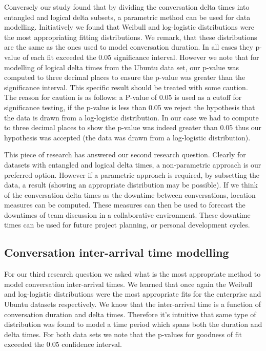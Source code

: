 \documentclass[conference]{IEEEtran}
\begin{document}
Conversely our study found that by dividing the conversation delta times into entangled and logical delta subsets, a parametric method can be used for data modelling. Initiatively we found that Weibull and log-logistic distributions were the most appropriating fitting distributions. We remark, that these distributions are the same as the ones used to model conversation duration. In all cases they p-value of each fit exceeded the 0.05 significance interval. However we note that for modelling of logical delta times from the Ubuntu data set, our p-value was computed to three decimal places to ensure the p-value was greater than the significance interval. This specific result should be treated with some caution. The reason for caution is as follows: a P-value of 0.05 is used as a cutoff for significance testing, if the p-value is less than 0.05 we reject the hypothesis that the data is drawn from a log-logistic distribution. In our case we had to compute to three decimal places to show the p-value was indeed greater than 0.05 thus our hypothesis was accepted (the data was drawn from a log-logistic distribution).  

This piece of research has answered our second research question. Clearly for datasets with entangled and logical delta times, a non-parametric approach is our preferred option. However if a parametric approach is required, by subsetting the data, a result (showing an appropriate distribution may be possible). If we think of the conversation delta times as the downtime between conversations, location measures can be computed. These measures can then be used to forecast the downtimes of team discussion in a collaborative environment. These downtime times can be used for future project planning, or personal development cycles.

\subsection{Conversation inter-arrival time modelling}

For our third research question we asked what is the most appropriate method to model conversation inter-arrival times. We learned that once again the Weibull and log-logistic distributions were the most appropriate fits for the enterprise and Ubuntu datasets respectively. We know that the inter-arrival time is a function of conversation duration and delta times. Therefore it's intuitive that same type of distribution was found to model a time period which spans both the duration and delta times. For both data sets we note that the p-values for goodness of fit exceeded the 0.05 confidence interval.
\end{document}
